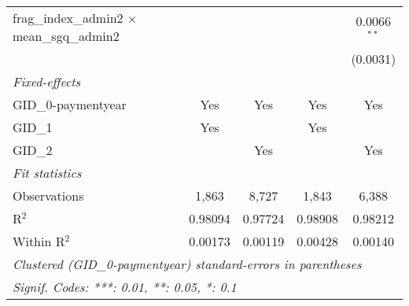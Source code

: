 \begin{tabular}{lcccc}
   frag\_index\_admin2 $\times$ mean\_sgq\_admin2      &              &                &          & 0.0066$^{**}$\\   
                                                       &              &                &          & (0.0031)\\   
   \midrule
   \emph{Fixed-effects}\\
   GID\_0-paymentyear                                  & Yes          & Yes            & Yes      & Yes\\  
   GID\_1                                              & Yes          &                & Yes      & \\  
   GID\_2                                              &              & Yes            &          & Yes\\  
   \midrule
   \emph{Fit statistics}\\
   Observations                                        & 1,863        & 8,727          & 1,843    & 6,388\\  
   R$^2$                                               & 0.98094      & 0.97724        & 0.98908  & 0.98212\\  
   Within R$^2$                                        & 0.00173      & 0.00119        & 0.00428  & 0.00140\\  
   \midrule \midrule
   \multicolumn{5}{l}{\emph{Clustered (GID\_0-paymentyear) standard-errors in parentheses}}\\
   \multicolumn{5}{l}{\emph{Signif. Codes: ***: 0.01, **: 0.05, *: 0.1}}\\
\end{tabular}
\par\endgroup


